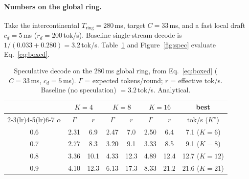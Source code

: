 \documentclass[11pt]{article}
\newcommand{\Tring}{\ensuremath{T_{\mathrm{ring}}}}
\newcommand{\Gam}{\ensuremath{\Gamma}}
\begin{document}
\paragraph{Numbers on the global ring.} Take the intercontinental $\Tring=280$\,ms, target
$C=33$\,ms, and a fast local draft $c_d=5$\,ms ($r_d=200$\,tok/s). Baseline single-stream decode is
$1/(0.033+0.280)=3.2$\,tok/s. Table~\ref{tab:spec} and Figure~\ref{fig:spec} evaluate
Eq.~\eqref{eq:boxed}.

\begin{table}[h]
\centering
\small
\caption{Speculative decode on the 280\,ms global ring, from Eq.~\eqref{eq:boxed}
($C{=}33$\,ms, $c_d{=}5$\,ms). $\Gam$ = expected tokens/round; $r$ = effective tok/s.
Baseline (no speculation) $=3.2$\,tok/s. Analytical.}
\label{tab:spec}
\begin{tabular}{c cc cc cc c}
\toprule
& \multicolumn{2}{c}{$K=4$} & \multicolumn{2}{c}{$K=8$} & \multicolumn{2}{c}{$K=16$} & best\\
\cmidrule(lr){2-3}\cmidrule(lr){4-5}\cmidrule(lr){6-7}
$\alpha$ & $\Gam$ & $r$ & $\Gam$ & $r$ & $\Gam$ & $r$ & tok/s ($K^{\star}$)\\
\midrule
0.6 & 2.31 & 6.9 & 2.47 & 7.0 & 2.50 & 6.4 & 7.1 ($K{=}6$)\\
0.7 & 2.77 & 8.3 & 3.20 & 9.1 & 3.33 & 8.5 & 9.1 ($K{=}8$)\\
0.8 & 3.36 & 10.1 & 4.33 & 12.3 & 4.89 & 12.4 & 12.7 ($K{=}12$)\\
0.9 & 4.10 & 12.3 & 6.13 & 17.3 & 8.33 & 21.2 & 21.6 ($K{=}21$)\\
\bottomrule
\end{tabular}
\end{table}
\end{document}

